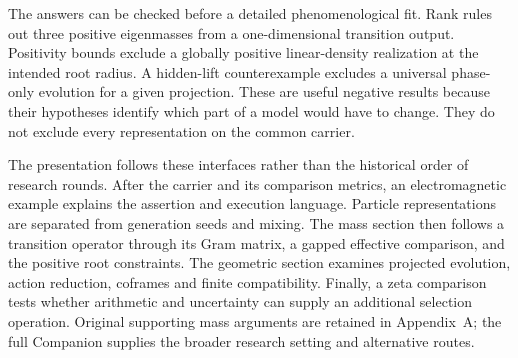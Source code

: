 The answers can be checked before a detailed phenomenological fit.
Rank rules out three positive eigenmasses from a one-dimensional
transition output. Positivity bounds exclude a globally positive
linear-density realization at the intended root radius. A hidden-lift
counterexample excludes a universal phase-only evolution for a given
projection. These are useful negative results because their hypotheses
identify which part of a model would have to change. They do not
exclude every representation on the common carrier.

The presentation follows these interfaces rather than the historical
order of research rounds. After the carrier and its comparison metrics,
an electromagnetic example explains the assertion and execution
language. Particle representations are separated from generation
seeds and mixing. The mass section then follows a transition operator
through its Gram matrix, a gapped effective comparison, and the positive
root constraints. The geometric section examines projected evolution,
action reduction, coframes and finite compatibility. Finally, a zeta
comparison tests whether arithmetic and uncertainty can supply an
additional selection operation. Original supporting mass arguments are
retained in Appendix~A; the full Companion \cite{QSC411} supplies the
broader research setting and alternative routes.
